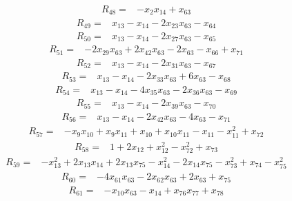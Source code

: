 \begin{align*}
R_{48}={}&-x_{2}x_{14}+x_{63}
\end{align*}
\begin{align*}
R_{49}={}&x_{13}-x_{14}-2x_{23}x_{63}-x_{64}
\end{align*}
\begin{align*}
R_{50}={}&x_{13}-x_{14}-2x_{27}x_{63}-x_{65}
\end{align*}
\begin{align*}
R_{51}={}&-2x_{29}x_{63}+2x_{42}x_{63}-2x_{63}-x_{66}+x_{71}
\end{align*}
\begin{align*}
R_{52}={}&x_{13}-x_{14}-2x_{31}x_{63}-x_{67}
\end{align*}
\begin{align*}
R_{53}={}&x_{13}-x_{14}-2x_{33}x_{63}+6x_{63}-x_{68}
\end{align*}
\begin{align*}
R_{54}={}&x_{13}-x_{14}-4x_{35}x_{63}-2x_{36}x_{63}-x_{69}
\end{align*}
\begin{align*}
R_{55}={}&x_{13}-x_{14}-2x_{39}x_{63}-x_{70}
\end{align*}
\begin{align*}
R_{56}={}&x_{13}-x_{14}-2x_{42}x_{63}-4x_{63}-x_{71}
\end{align*}
\begin{align*}
R_{57}={}&-x_{9}x_{10}+x_{9}x_{11}+x_{10}+x_{10}x_{11}-x_{11}-x_{11}^{2}+x_{72}
\end{align*}
\begin{align*}
R_{58}={}&1+2x_{12}+x_{12}^{2}-x_{72}^{2}+x_{73}
\end{align*}
\begin{align*}
R_{59}={}&-x_{13}^{2}+2x_{13}x_{14}+2x_{13}x_{75}-x_{14}^{2}-2x_{14}x_{75}-x_{73}^{2}+x_{74}-x_{75}^{2}
\end{align*}
\begin{align*}
R_{60}={}&-4x_{61}x_{63}-2x_{62}x_{63}+2x_{63}+x_{75}
\end{align*}
\begin{align*}
R_{61}={}&-x_{10}x_{63}-x_{14}+x_{76}x_{77}+x_{78}
\end{align*}
